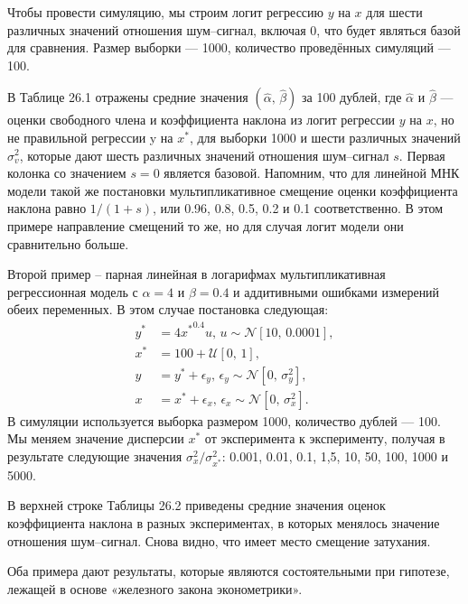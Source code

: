 Чтобы провести симуляцию, мы строим логит регрессию $y$ на $x$ для шести различных значений отношения шум--сигнал, включая 0, что будет являться базой для сравнения. Размер выборки --- 1000, количество проведённых симуляций --- 100. 

В Таблице 26.1 отражены средние значения $(\widehat{\alpha}, \, \widehat{\beta})$ за 100 дублей, где $\widehat{\alpha}$ и $\widehat{\beta}$ --- оценки свободного члена и коэффициента наклона из логит регрессии $y$ на $x$, но не правильной регрессии y на $x^*$, для выборки 1000 и шести различных значений $\sigma^2_v$, которые дают шесть различных значений отношения шум--сигнал $s$. Первая колонка со значением $s=0$ является базовой. Напомним, что для линейной МНК модели такой же постановки  мультипликативное смещение оценки коэффициента наклона равно $1/(1+s)$, или 0.96, 0.8, 0.5, 0.2 и 0.1 соответственно. В этом примере  направление смещений то же, но для случая логит модели они сравнительно больше.

Второй пример – парная линейная в логарифмах мультипликативная регрессионная модель с $\alpha=4$ и $\beta=0.4$ и аддитивными ошибками измерений обеих переменных. В этом случае постановка следующая:
\begin{align*}
y^* &= 4{x^*}^{0.4}u, \, u \sim \mathcal{N}[10, \, 0.0001], \\
x^* &= 100+ \mathcal{U}[0, \, 1], \\
y &= y^*+ \epsilon_y, \, \epsilon_y \sim \mathcal{N}[0, \, \sigma^2_y], \\
x &= x^*+ \epsilon_x, \, \epsilon_x \sim \mathcal{N}[0, \, \sigma^2_x].
\end{align*}
В симуляции используется выборка размером 1000, количество дублей --- 100. Мы меняем значение дисперсии $x^*$ от эксперимента к эксперименту, получая в результате следующие значения $\sigma^2_{x} / \sigma^2_{x^*}$: 0.001, 0.01, 0.1, 1,5, 10, 50, 100, 1000 и 5000.

В верхней строке Таблицы 26.2 приведены средние значения оценок коэффициента наклона в разных экспериментах, в которых менялось значение отношения шум--сигнал. Снова видно, что имеет место смещение затухания.

Оба примера дают результаты, которые являются состоятельными при гипотезе, лежащей в основе «железного закона эконометрики».

